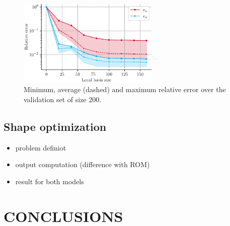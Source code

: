 \documentclass[a4paper]{eccomas_paper-2024}
\begin{document}
\begin{figure}
    \begin{center}
        \includegraphics[width=0.6\textwidth]{relerr.pdf}
    \end{center}
    \caption{Minimum, average (dashed) and maximum relative error over the validation set of size $200$.}\label{fig:relerr}
\end{figure}



\subsection{Shape optimization} %
\label{sub:Shape optimization}

\begin{itemize}
    \item problem definiot
    \item output computation (difference with ROM)
    \item result for both models
\end{itemize}


\section{CONCLUSIONS} %
\label{sec:conclusions}


\end{document}
